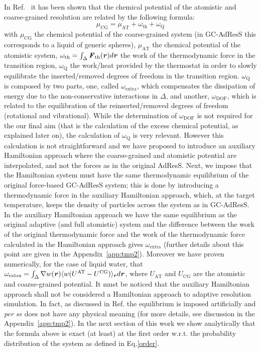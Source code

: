 \documentclass[a4paper,preprint,unsortedaddress]{revtex4-1}
\newcommand{\recheck}[1]{{\color{red} #1}}
\newcommand{\vect}[1]{\textbf{\textit{#1}}}
\newcommand{\dof}{{\textrm{DOF}}}
\newcommand{\AT}{{\textrm{{AT}}}}
\newcommand{\CG}{{\textrm{CG}}}
\newcommand{\thf}{{\textrm{th}}}
\newcommand{\ext}{{\textrm{extra}}}
\newcommand{\thermo}{{\textrm{Q}}}
\begin{document}
In Ref.~\cite{prx} it has been shown that the chemical potential of the atomistic and coarse-grained resolution are related by the following formula: 
\begin{equation}
\mu_{\CG}=\mu_{\AT}+\omega_{\thf}+\omega_{\thermo}
\label{mu}
\end{equation}
with $\mu_{\CG}$ the chemical potential of the coarse-grained system (in GC-AdResS this corresponds to a liquid of generic spheres), $\mu_{\AT}$  the chemical potential of the atomistic system, $\omega_{\thf}=\int_{\Delta}{\vect F}_{\thf}({\vect r})d{\vect r}$ the work of the thermodynamic force in the transition region, $\omega_{\thermo}$ the work/heat provided by the thermostat in order to slowly equilibrate the inserted/removed degrees of freedom in the transition region. $\omega_{\thermo}$ is composed by two parts, one, called $\omega_{\ext}$, which compensates the dissipation of energy due to the non-conservative interactions in $\Delta$, and another, $\omega_{\dof}$, which is related to the equilibration of the reinserted/removed degrees of freedom (rotational and vibrational). \recheck{While the determination of $\omega_{\dof}$ is not required for the our final aim (that is the calculation of the excess chemical potential, as explained later on), the calculation of $\omega_{\thermo}$ is very relevant}. However this calculation is not straightforward and we have proposed to introduce an auxiliary Hamiltonian approach where the coarse-grained and atomistic potential are interpolated, and not the forces as in \recheck{the original} AdResS. Next, we impose that the Hamiltonian system must have the same thermodynamic equilibrium of the original force-based GC-AdResS system; this is done by introducing a thermodynamic force in the auxiliary Hamiltonian approach, which, at the target temperature, keeps the density of particles across the system as in GC-AdResS. \recheck{In the auxiliary Hamiltonian approach we have the same equilibrium as the original adaptive (and full atomistic) system  and the difference between the work of the original thermodynamic force and the work of the thermodynamic force calculated in the Hamiltonian approach gives $\omega_{\ext}$ (further details about this point are given in the {Appendix~\ref{app:tmp2}})}. Moreover we have proven numerically, for the case of liquid water, that
  $\omega_{\ext}=\int_{\Delta}\nabla w(\vect r)\langle w( U^{\AT}-U^{\CG})\rangle_{\vect r} d{\vect r}$,
  where $U_{\AT}$ and $U_{\CG}$ are the atomistic and coarse-grained potential.
\recheck{It must be noticed that the auxiliary Hamiltonian approach shall not be considered a Hamiltonian approach to adaptive resolution simulation. In fact, as discussed in Ref.\cite{prx} the equilibrium is imposed artificially and {\it per se} does not have any physical meaning (for more details, see discussion in the {Appendix~\ref{app:tmp2}})}. 
  \recheck{In the next section of this work we show analytically that the formula above is exact (at least) at the first order w.r.t. the probability distribution of the system as defined in Eq.\ref{order}}.
  
\end{document}
